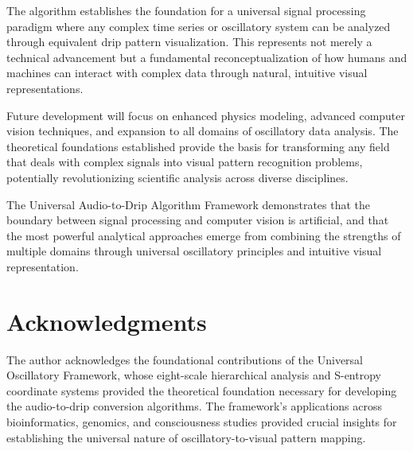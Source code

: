 \documentclass[12pt,a4paper]{article}
\begin{document}
The algorithm establishes the foundation for a universal signal processing paradigm where any complex time series or oscillatory system can be analyzed through equivalent drip pattern visualization. This represents not merely a technical advancement but a fundamental reconceptualization of how humans and machines can interact with complex data through natural, intuitive visual representations.

Future development will focus on enhanced physics modeling, advanced computer vision techniques, and expansion to all domains of oscillatory data analysis. The theoretical foundations established provide the basis for transforming any field that deals with complex signals into visual pattern recognition problems, potentially revolutionizing scientific analysis across diverse disciplines.

The Universal Audio-to-Drip Algorithm Framework demonstrates that the boundary between signal processing and computer vision is artificial, and that the most powerful analytical approaches emerge from combining the strengths of multiple domains through universal oscillatory principles and intuitive visual representation.

\section{Acknowledgments}

The author acknowledges the foundational contributions of the Universal Oscillatory Framework, whose eight-scale hierarchical analysis and S-entropy coordinate systems provided the theoretical foundation necessary for developing the audio-to-drip conversion algorithms. The framework's applications across bioinformatics, genomics, and consciousness studies provided crucial insights for establishing the universal nature of oscillatory-to-visual pattern mapping.
\end{document}
